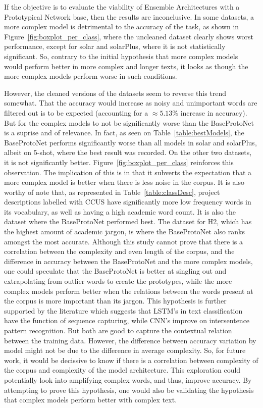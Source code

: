 \documentclass[letterpaper]{article} %
\begin{document}
If the objective is to evaluate
the viability of Ensemble Architectures with a Prototypical Network base, then the results are inconclusive. In some datasets, a more complex model is detrimental
to the accuracy of the task, as shown in Figure~\ref{fig:boxplot_per_class}, where the uncleaned dataset clearly shows worst performance, except for solar and solarPlus, where it is not statistically significant.
So, contrary to the initial hypothesis that more complex models would perform better in more complex and longer texts, it looks as though the more complex models perform worse in such conditions.

However, the cleaned versions of the datasets seem to reverse this trend somewhat. That the accuracy would increase as noisy and unimportant words are filtered out is to be expected (accounting for a $\approx 5.13\%$ increase in accuracy). 
But for the complex models to not be significantly worse than the BaseProtoNet is a suprise and of relevance.
In fact, as seen on Table~\ref{table:bestModels}, the BaseProtoNet performs significantly worse than all models in solar and solarPlus, albeit on 5-shot, where the best result was recorded. On the other two datasets, it is not significantly better. Figure~\ref{fig:boxplot_per_class} reinforces this observation.
The implication of this 
is in that it subverts the expectation that a more complex model is better when there is less noise in the corpus. It is also worthy of note that, as represented in Table~\ref{table:classDesc}, project descriptions labelled with CCUS
have significantly more low frequency words in its vocabulary, as well as having a high academic word count. It is also the dataset where the BaseProtoNet performed best. 
The dataset for H2, which has the highest amount of academic jargon, is where the BaseProtoNet also ranks amongst the most accurate. Although this study cannot prove that there is a correlation between the complexity and even length of the corpus, and the difference in accuracy between the BaseProtoNet and the more complex models, one could speculate that the BaseProtoNet is better at singling out and extrapolating from outlier words to create the prototypes, while the more complex models perform better when the relations between the words present at the corpus is more important than its jargon.
This hypothesis 
is further supported 
by the literature which suggests 
that LSTM's in text classification have the function of sequence capturing\cite{Xue2022-pw}, while CNN's improve on intersentence pattern recognition\cite{zhou2015clstmneuralnetworktext}. But both are good to capture the contextual relation between the training data\cite{KAUR2023108699}.
However, the difference between accuracy variation by model might not be due to the difference in average complexity. So, for future work, it would be decissive to know if there is a correlation between complexity of the corpus and complexity of the model architecture. This exploration could potentially look into amplifying complex words, and thus, improve accuracy. By attempting to prove this hypothesis, one would also be validating the hypothesis that complex models perform better with complex text.  
\end{document}
